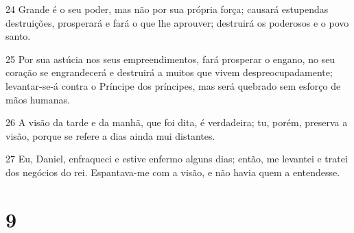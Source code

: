 \par 24 Grande é o seu poder, mas não por sua própria força; causará estupendas destruições, prosperará e fará o que lhe aprouver; destruirá os poderosos e o povo santo.
\par 25 Por sua astúcia nos seus empreendimentos, fará prosperar o engano, no seu coração se engrandecerá e destruirá a muitos que vivem despreocupadamente; levantar-se-á contra o Príncipe dos príncipes, mas será quebrado sem esforço de mãos humanas.
\par 26 A visão da tarde e da manhã, que foi dita, é verdadeira; tu, porém, preserva a visão, porque se refere a dias ainda mui distantes.
\par 27 Eu, Daniel, enfraqueci e estive enfermo alguns dias; então, me levantei e tratei dos negócios do rei. Espantava-me com a visão, e não havia quem a entendesse.

\chapter{9}

